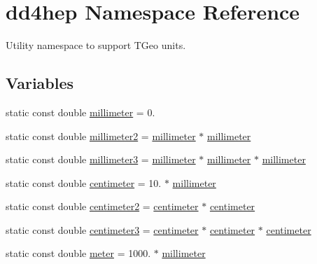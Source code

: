 \hypertarget{namespacedd4hep}{}\section{dd4hep Namespace Reference}
\label{namespacedd4hep}


Utility namespace to support T\+Geo units.  


\subsection*{Variables}
\begin{DoxyCompactItemize}
\item 
static const double \hyperlink{namespacedd4hep_a1b3044c28560621f033b6f0fb9a15854}{millimeter} = 0.
\item 
static const double \hyperlink{namespacedd4hep_a1096fbca749064ac09ed44d5a2b37599}{millimeter2} = \hyperlink{namespacedd4hep_a1b3044c28560621f033b6f0fb9a15854}{millimeter} $\ast$ \hyperlink{namespacedd4hep_a1b3044c28560621f033b6f0fb9a15854}{millimeter}
\item 
static const double \hyperlink{namespacedd4hep_a2ea09df717c3b153b6ea78fbd517fddc}{millimeter3} = \hyperlink{namespacedd4hep_a1b3044c28560621f033b6f0fb9a15854}{millimeter} $\ast$ \hyperlink{namespacedd4hep_a1b3044c28560621f033b6f0fb9a15854}{millimeter} $\ast$ \hyperlink{namespacedd4hep_a1b3044c28560621f033b6f0fb9a15854}{millimeter}
\item 
static const double \hyperlink{namespacedd4hep_af17522b334712876a204971dee26c063}{centimeter} = 10. $\ast$ \hyperlink{namespacedd4hep_a1b3044c28560621f033b6f0fb9a15854}{millimeter}
\item 
static const double \hyperlink{namespacedd4hep_a43a537cf81dbb2fb1476264a37bb3945}{centimeter2} = \hyperlink{namespacedd4hep_af17522b334712876a204971dee26c063}{centimeter} $\ast$ \hyperlink{namespacedd4hep_af17522b334712876a204971dee26c063}{centimeter}
\item 
static const double \hyperlink{namespacedd4hep_a5d565a155d7d3b225e52dc0b97c8186d}{centimeter3} = \hyperlink{namespacedd4hep_af17522b334712876a204971dee26c063}{centimeter} $\ast$ \hyperlink{namespacedd4hep_af17522b334712876a204971dee26c063}{centimeter} $\ast$ \hyperlink{namespacedd4hep_af17522b334712876a204971dee26c063}{centimeter}
\item 
static const double \hyperlink{namespacedd4hep_a46f5cf0231796af4296a307a58812b06}{meter} = 1000. $\ast$ \hyperlink{namespacedd4hep_a1b3044c28560621f033b6f0fb9a15854}{millimeter}

\end{DoxyCompactItemize}
